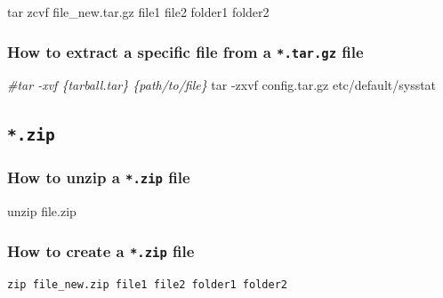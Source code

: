 \documentclass[]{book}
\makeatletter
\newenvironment{Shaded}{\begin{snugshade}}{\end{snugshade}}
\newcommand{\CommentTok}[1]{\textcolor[rgb]{0.56,0.35,0.01}{\textit{#1}}}
\newcommand{\FunctionTok}[1]{\textcolor[rgb]{0.00,0.00,0.00}{#1}}
\newcommand{\NormalTok}[1]{#1}
\newenvironment{kframe}{%
\medskip{}
\setlength{\fboxsep}{.8em}
 \def\at@end@of@kframe{}%
 \ifinner\ifhmode%
  \def\at@end@of@kframe{\end{minipage}}%
  \begin{minipage}{\columnwidth}%
 \fi\fi%
 \def\FrameCommand##1{\hskip\@totalleftmargin \hskip-\fboxsep
 \colorbox{shadecolor}{##1}\hskip-\fboxsep
     \hskip-\linewidth \hskip-\@totalleftmargin \hskip\columnwidth}%
 \MakeFramed {\advance\hsize-\width
   \@totalleftmargin\z@ \linewidth\hsize
   \@setminipage}}%
 {\par\unskip\endMakeFramed%
 \at@end@of@kframe}
\renewenvironment{Shaded}{\begin{kframe}}{\end{kframe}}
\makeatother
\begin{document}
\begin{Shaded}
\begin{Highlighting}[]
\FunctionTok{tar}\NormalTok{ zcvf file_new.tar.gz file1 file2 folder1 folder2}
\end{Highlighting}
\end{Shaded}

\hypertarget{how-to-extract-a-specific-file-from-a-.tar.gz-file}{%
\subsubsection{\texorpdfstring{How to extract a specific file from a \texttt{*.tar.gz} file}{How to extract a specific file from a *.tar.gz file}}\label{how-to-extract-a-specific-file-from-a-.tar.gz-file}}

\begin{Shaded}
\begin{Highlighting}[]
\CommentTok{#tar -xvf \{tarball.tar\} \{path/to/file\}}
\FunctionTok{tar}\NormalTok{ -zxvf config.tar.gz etc/default/sysstat}
\end{Highlighting}
\end{Shaded}

\hypertarget{zip}{%
\subsection{\texorpdfstring{\texttt{*.zip}}{*.zip}}\label{zip}}

\hypertarget{how-to-unzip-a-.zip-file}{%
\subsubsection{\texorpdfstring{How to unzip a \texttt{*.zip} file}{How to unzip a *.zip file}}\label{how-to-unzip-a-.zip-file}}

\begin{Shaded}
\begin{Highlighting}[]
\FunctionTok{unzip}\NormalTok{ file.zip}
\end{Highlighting}
\end{Shaded}

\hypertarget{how-to-create-a-.zip-file}{%
\subsubsection{\texorpdfstring{How to create a \texttt{*.zip} file}{How to create a *.zip file}}\label{how-to-create-a-.zip-file}}

\begin{verbatim}
zip file_new.zip file1 file2 folder1 folder2
\end{verbatim}
\end{document}
